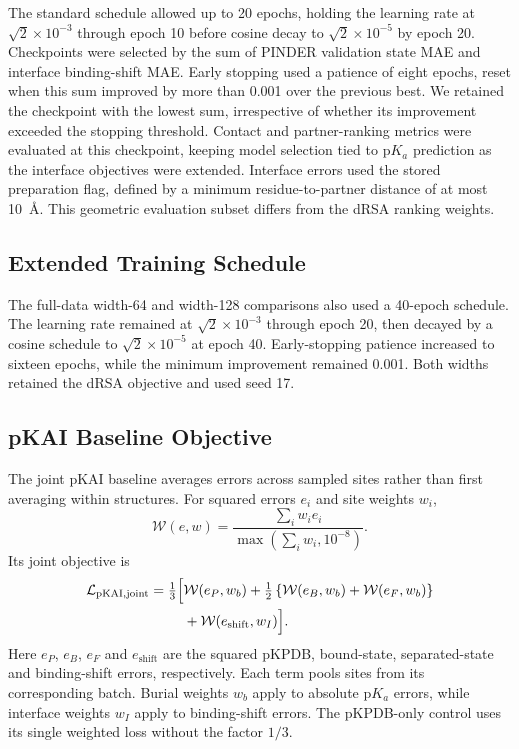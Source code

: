 The standard schedule allowed up to 20 epochs, holding the learning rate at $\sqrt{2}\times10^{-3}$ through epoch 10 before cosine decay to $\sqrt{2}\times10^{-5}$ by epoch 20. Checkpoints were selected by the sum of PINDER validation state MAE and interface binding-shift MAE. Early stopping used a patience of eight epochs, reset when this sum improved by more than 0.001 over the previous best. We retained the checkpoint with the lowest sum, irrespective of whether its improvement exceeded the stopping threshold. Contact and partner-ranking metrics were evaluated at this checkpoint, keeping model selection tied to $\mathrm{p}K_a$ prediction as the interface objectives were extended. Interface errors used the stored preparation flag, defined by a minimum residue-to-partner distance of at most 10~\AA{}. This geometric evaluation subset differs from the dRSA ranking weights.

\subsection{Extended Training Schedule}
\label{app:jaxka-extended-schedule}

The full-data width-64 and width-128 comparisons also used a 40-epoch schedule. The learning rate remained at $\sqrt{2}\times10^{-3}$ through epoch 20, then decayed by a cosine schedule to $\sqrt{2}\times10^{-5}$ at epoch 40. Early-stopping patience increased to sixteen epochs, while the minimum improvement remained 0.001. Both widths retained the dRSA objective and used seed 17.

\subsection{pKAI Baseline Objective}
\label{app:jaxka-pkai-objective}

The joint pKAI baseline averages errors across sampled sites rather than first averaging within structures. For squared errors $e_i$ and site weights $w_i$,
\begin{equation}
    \mathcal W(e,w)=
    \frac{\sum_i w_i e_i}{\max\!\left(\sum_i w_i,10^{-8}\right)}.
    \label{eq:jaxka-pkai-reduction}
\end{equation}
Its joint objective is
\begin{equation}
    \begin{aligned}
        \mathcal L_{\mathrm{pKAI,joint}}
        =\tfrac13\Bigl[{}&\mathcal W(e_P,w_b)
        +\tfrac12\left\{\mathcal W(e_B,w_b)+\mathcal W(e_F,w_b)\right\}\\
        &+\mathcal W(e_{\mathrm{shift}},w_I)\Bigr].
    \end{aligned}
    \label{eq:jaxka-pkai-loss}
\end{equation}
Here $e_P$, $e_B$, $e_F$ and $e_{\mathrm{shift}}$ are the squared pKPDB, bound-state, separated-state and binding-shift errors, respectively. Each term pools sites from its corresponding batch. Burial weights $w_b$ apply to absolute $\mathrm{p}K_a$ errors, while interface weights $w_I$ apply to binding-shift errors. The pKPDB-only control uses its single weighted loss without the factor $1/3$.

